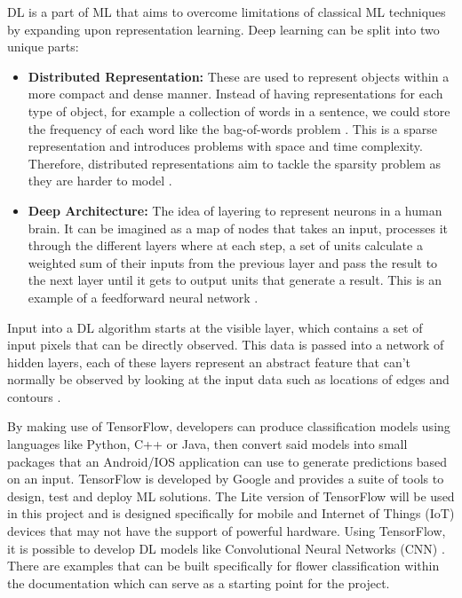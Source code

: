 \documentclass[12pt,a4paper]{report}
\begin{document}
\par

DL is a part of ML that aims to overcome limitations of classical ML techniques 
by expanding upon representation learning. Deep learning can be split into two unique parts:

\begin{itemize}
    \item \textbf{Distributed Representation:} These are used to represent objects within a more compact and dense manner.
Instead of having representations for each type of object, for example a collection of words in a sentence, we could 
store the frequency of each word like the bag-of-words problem \citep{liu2020representation}. This is a sparse
representation and introduces problems with space and time complexity. Therefore, distributed representations aim to 
tackle the sparsity problem as they are harder to model \citep{Brownlee2017}.
    \item \textbf{Deep Architecture:} The idea of layering to represent neurons in a human brain. It can be imagined 
    as a map of 
nodes that takes an input, processes it through the different layers where at each step, a set of units calculate a 
weighted sum of their inputs from the previous layer and pass the result to the next layer until it gets to output units
that generate a result. This is an example of a feedforward neural network \citep{lecun2015deep}.
\end{itemize}

\par

Input into a DL algorithm starts at the visible layer, which contains a set of input pixels that can be
directly observed. This data is passed into a network of hidden layers, each of these layers represent an abstract 
feature that can't normally be observed by looking at the input data such as locations of edges and contours 
\citep[p. 26]{goodfellow2016deep}.

\par

By making use of TensorFlow, developers can produce classification models using languages like Python, C++ or Java, then 
convert said models into small packages that an Android/IOS application can use to generate predictions based on an 
input. TensorFlow is developed by Google and provides a suite of tools to design, test and 
deploy ML solutions. The Lite version of TensorFlow will be used in this project and is designed specifically for mobile and Internet of 
Things (IoT) devices 
that may not have the support of powerful hardware. Using TensorFlow, it is possible to develop DL models like 
Convolutional Neural Networks (CNN) \citep{googleTF2}. 
There are examples that can be built specifically for flower classification within the documentation which can serve
as a starting point for the project.
\end{document}
